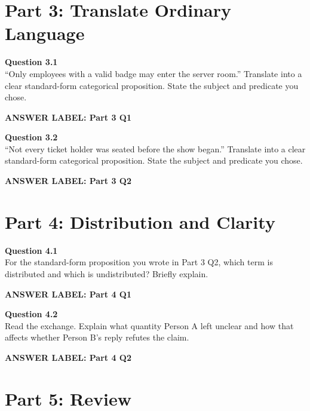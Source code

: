 \documentclass[12pt]{article}
\newcommand{\answerbox}[2]{%
\vspace{0.15em}
\noindent\textbf{#1}\par
\vspace{0.05em}
\noindent\fbox{%
\begin{minipage}[t][#2]{\dimexpr\textwidth-2\fboxsep-2\fboxrule}
\rule{\textwidth}{0pt}
\vspace{#2}
\end{minipage}
}\par
\vspace{0.25em}
}
\begin{document}
\section*{Part 3: Translate Ordinary Language}

\textbf{Question 3.1}\\[-0.15em]
``Only employees with a valid badge may enter the server room.'' Translate into a clear standard-form categorical proposition. State the subject and predicate you chose.

\answerbox{ANSWER LABEL: Part 3 Q1}{2.35in}

\textbf{Question 3.2}\\[-0.15em]
``Not every ticket holder was seated before the show began.'' Translate into a clear standard-form categorical proposition. State the subject and predicate you chose.

\answerbox{ANSWER LABEL: Part 3 Q2}{2.35in}

\newpage

\section*{Part 4: Distribution and Clarity}

\textbf{Question 4.1}\\[-0.15em]
For the standard-form proposition you wrote in Part 3 Q2, which term is distributed and which is undistributed? Briefly explain.

\answerbox{ANSWER LABEL: Part 4 Q1}{2.15in}

\textbf{Question 4.2}\\[-0.15em]
Read the exchange. Explain what quantity Person A left unclear and how that affects whether Person B's reply refutes the claim.

\vspace{0.2em}

\noindent{}

\answerbox{ANSWER LABEL: Part 4 Q2}{2.45in}

\newpage

\section*{Part 5: Review}
\end{document}
